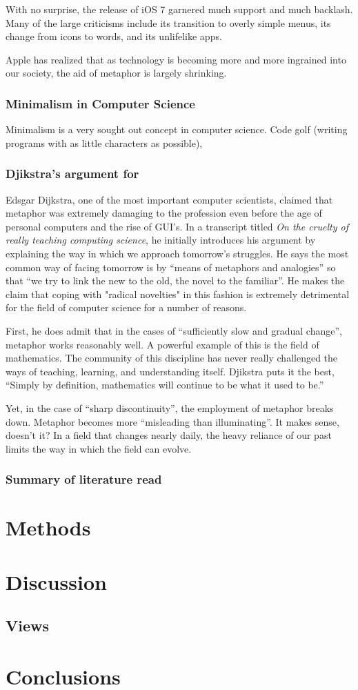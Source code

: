 \documentclass[11pt, oneside]{article}   	%
\begin{document}
With no surprise, the release of iOS 7 garnered much support and much backlash. Many of the large criticisms include its transition to overly simple menus, its change from icons to words, and its unlifelike apps. 

Apple has realized that as technology is becoming more and more ingrained into our society, the aid of metaphor is largely shrinking.

\subsubsection{Minimalism in Computer Science}
Minimalism is a very sought out concept in computer science. Code golf (writing programs with as little characters as possible), 

\subsubsection{Djikstra's argument for}
Edsgar Dijkstra, one of the most important computer scientists, claimed that metaphor was extremely damaging to the profession even before the age of personal computers and the rise of GUI's. In a transcript titled \textit{On the cruelty of really teaching computing science}, he initially introduces his argument by explaining the way in which we approach tomorrow's struggles. He says the most common way of facing tomorrow is by ``means of metaphors and analogies'' so that ``we try to link the new to the old, the novel to the familiar''. He makes the claim that coping with "radical novelties" in this fashion is extremely detrimental for the field of computer science for a number of reasons.

First, he does admit that in the cases of ``sufficiently slow and gradual change'', metaphor works reasonably well. A powerful example of this is the field of mathematics. The community of this discipline has never really challenged the ways of teaching, learning, and understanding itself. Djikstra puts it the best, ``Simply by definition, mathematics will continue to be what it used to be.''

Yet, in the case of ``sharp discontinuity'', the employment of metaphor breaks down. Metaphor becomes more ``misleading than illuminating''. It makes sense, doesn't it? In a field that changes nearly daily, the heavy reliance of our past limits the way in which the field can evolve.
\cite{ewd1036}

\subsubsection{Summary of literature read}

\section{Methods}
\section{Discussion}
\subsection{Views}

\section{Conclusions}




\end{document}
